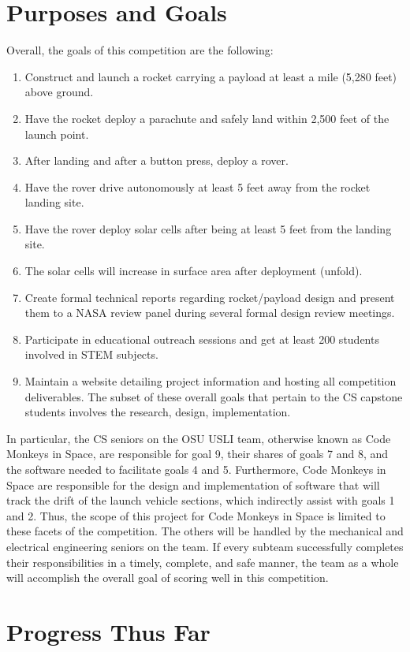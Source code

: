 \documentclass[onecolumn, draftclsnofoot, 10pt, compsoc]{IEEEtran}
\begin{document}
\section{Purposes and Goals}
Overall, the goals of this competition are the following:
\begin{enumerate}
\item Construct and launch a rocket carrying a payload at least a mile (5,280 feet) above ground.
\item Have the rocket deploy a parachute and safely land within 2,500 feet of the launch point.
\item After landing and after a button press, deploy a rover.
\item Have the rover drive autonomously at least 5 feet away from the rocket landing site.
\item Have the rover deploy solar cells after being at least 5 feet from the landing site.
\item The solar cells will increase in surface area after deployment (unfold).
\item Create formal technical reports regarding rocket/payload design and present them to a NASA review panel
during several formal design review meetings.
\item Participate in educational outreach sessions and get at least 200 students involved in STEM subjects.
\item Maintain a website detailing project information and hosting all competition deliverables.
The subset of these overall goals that pertain to the CS capstone students involves the research, design, implementation.
\end{enumerate}
In particular, the CS seniors on the OSU USLI team, otherwise known as Code Monkeys in Space, are responsible for goal 9, their shares of goals 7 and 8, and the software needed to facilitate goals 4 and 5. Furthermore, Code Monkeys in Space are responsible for the design and implementation of software that will track the drift of the launch vehicle sections, which indirectly assist with goals 1 and 2. Thus, the scope of this project for Code Monkeys in Space is limited to these facets of the competition. The others will be handled by the mechanical and electrical engineering seniors on the team. If every subteam successfully completes their responsibilities in a timely, complete, and safe manner, the team as a whole will accomplish the overall goal of scoring well in this competition.

\section{Progress Thus Far}
\end{document}

